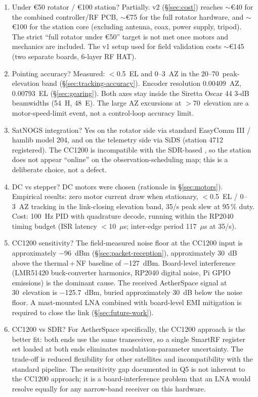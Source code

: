 \begin{enumerate}
    \item Under €50 rotator / €100 station? Partially. v2 (\S\ref{sec:cost}) reaches $\sim$€40 for the combined controller/RF PCB, $\sim$€75 for the full rotator hardware, and $\sim$€100 for the station core (excluding antenna, coax, power supply, tripod). The strict ``full rotator under €50'' target is not met once motors and mechanics are included. The v1 setup used for field validation costs $\sim$€145 (two separate boards, 6-layer RF HAT).
    \item Pointing accuracy? Measured: $<$0.5\degree\ EL and 0\degree--3\degree\ AZ in the 20\degree--70\degree\ peak-elevation band (\S\ref{sec:tracking-accuracy}). Encoder resolution 0.00409\degree\ AZ, 0.00793\degree\ EL (\S\ref{sec:gearing}). Both axes stay inside the Siretta Oscar 44 3-dB beamwidths (54\degree\ H, 48\degree\ E). The large AZ excursions at $>$70\degree\ elevation are a motor-speed-limit event, not a control-loop accuracy limit.
    \item SatNOGS integration? Yes on the rotator side via standard EasyComm III / hamlib model 204, and on the telemetry side via SiDS (station 4712 registered). The CC1200 is incompatible with the SDR-based , so the station does not appear ``online'' on the observation-scheduling map; this is a deliberate choice, not a defect.
    \item DC vs stepper? DC motors were chosen (rationale in \S\ref{sec:motors}). Empirical results: zero motor current draw when stationary, $<$0.5\degree\ EL / 0\degree--3\degree\ AZ tracking in the link-closing elevation band, 35\degree/s peak slew at 95\,\% duty. Cost: 100~Hz PID with quadrature decode, running within the RP2040 timing budget (ISR latency $<$10~$\mu$s; inter-edge period 117~$\mu$s at 35\degree/s).
    \item CC1200 sensitivity? The field-measured noise floor at the CC1200 input is approximately $-$96~dBm (\S\ref{sec:packet-reception}), approximately 30~dB above the thermal\,+\,NF baseline of $-$127~dBm. Board-level interference (LMR51420 buck-converter harmonics, RP2040 digital noise, Pi GPIO emissions) is the dominant cause. The received AetherSpace signal at 30\degree\ elevation is $-$125.7~dBm, buried approximately 30~dB below the noise floor. A mast-mounted LNA combined with board-level EMI mitigation is required to close the link (\S\ref{sec:future-work}).
    \item CC1200 vs SDR? For AetherSpace specifically, the CC1200 approach is the better fit: both ends use the same transceiver, so a single SmartRF register set loaded at both ends eliminates modulation-parameter uncertainty. The trade-off is reduced flexibility for other satellites and incompatibility with the standard  pipeline. The sensitivity gap documented in Q5 is not inherent to the CC1200 approach; it is a board-interference problem that an LNA would resolve equally for any narrow-band receiver on this hardware.
\end{enumerate}

